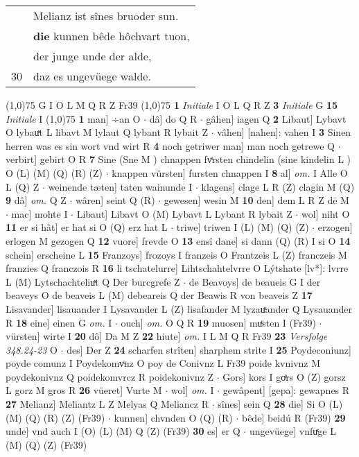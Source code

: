 \documentclass[8pt,a4paper,notitlepage]{article}
\begin{document}
\begin{table}[ht]
\begin{minipage}[t]{0.5\linewidth}
\begin{tabular}{rl}
 & Melianz ist sînes bruoder sun.\\ 
 & \textbf{die} kunnen bêde hôchvart tuon,\\ 
 & der junge unde der alde,\\ 
30 & daz es ungevüege walde.\\ 
\end{tabular}
\scriptsize
\line(1,0){75} \newline
G I O L M Q R Z Fr39 \newline
\line(1,0){75} \newline
\textbf{1} \textit{Initiale} I O L Q R Z  \textbf{3} \textit{Initiale} G  \textbf{15} \textit{Initiale} I  \newline
\line(1,0){75} \newline
\textbf{1} man] ÷an O  $\cdot$ dâ] do Q R  $\cdot$ gâhen] iagen Q \textbf{2} Libaut] Lybavt O lybauͯt L libavt M lylaut Q lybant R lybait Z  $\cdot$ vâhen] [nahen]: vahen I \textbf{3} Sinen herren was es sin wort vnd wirt R \textbf{4} noch getriwer man] man noch getrewe Q  $\cdot$ verbirt] gebirt O R \textbf{7} Sine (Sne M ) chnappen fvͤrsten chindelin (sine kindelin L ) O (L) (M) (Q) (R) (Z)  $\cdot$ knappen vürsten] fursten chnappen I \textbf{8} al] \textit{om.} I Alle O L (Q) Z  $\cdot$ weinende tæten] taten wainunde I  $\cdot$ klagens] clage L R (Z) clagin M (Q) \textbf{9} dâ] \textit{om.} Q Z  $\cdot$ wâren] seint Q (R)  $\cdot$ gewesen] wesin M \textbf{10} den] dem L R Z dē M  $\cdot$ mac] mohte I  $\cdot$ Libaut] Libavt O (M) Lybavt L Lybant R lybait Z  $\cdot$ wol] niht O \textbf{11} er si hât] er hat si O (Q) erz hat L  $\cdot$ triwe] triwen I (L) (M) (Q) (Z)  $\cdot$ erzogen] erlogen M gezogen Q \textbf{12} vuore] frevde O \textbf{13} ensî dane] si dann (Q) (R) I si O \textbf{14} schein] erscheine L \textbf{15} Franzoys] frozoys I franzeis O Frantzeis L (Z) franczeis M franzies Q franczois R \textbf{16} li tschatelurre] Lihtschahtelvrre O Lýtshate [lv*]: lvrre L (M) Lytschachteliuͯt Q Der burcgrefe Z  $\cdot$ de Beavoys] de beaueis G I der beaveys O de beaveis L (M) debeareis Q der Beawis R von beaveis Z \textbf{17} Lisavander] lisauander I Lysavander L (Z) lisafander M lyzauͯander Q Lysauander R \textbf{18} eine] einen G \textit{om.} I  $\cdot$ ouch] \textit{om.} O Q R \textbf{19} muosen] muͤsten I (Fr39)  $\cdot$ vürsten] wirte I \textbf{20} dô] Da M Z \textbf{22} hiute] \textit{om.} I L M Q R Fr39 \textbf{23} \textit{Versfolge 348.24-23} O   $\cdot$ des] Der Z \textbf{24} scharfen strîten] sharphem strite I \textbf{25} Poydeconiunz] poyde comunz I Poydekomvͦnz O poy de Conivnz L Fr39 poide kvnivnz M poydekonivnz Q poidekomvrcz R poidekonivnz Z  $\cdot$ Gors] kors I goͤrs O (Z) gorsz L gorz M gros R \textbf{26} vüeret] Vurte M  $\cdot$ wol] \textit{om.} I  $\cdot$ gewâpent] [gepa]: gewapnes R \textbf{27} Melianz] Meliantz L Z Melyas Q Meliancz R  $\cdot$ sînes] sein Q \textbf{28} die] Si O (L) (M) (Q) (R) (Z) (Fr39)  $\cdot$ kunnen] chvnden O (Q) (R)  $\cdot$ bêde] beidú R (Fr39) \textbf{29} unde] vnd auch I (O) (L) (M) Q (Z) (Fr39) \textbf{30} es] er Q  $\cdot$ ungevüege] vnfuͯge L (M) (Q) (Z) (Fr39) \newline

\end{minipage}
\end{table}
\end{document}
